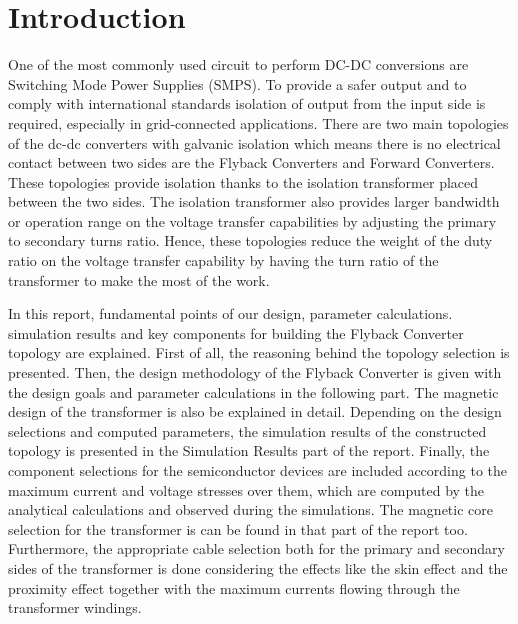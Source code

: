 \section{Introduction}

One of the most commonly used circuit to perform DC-DC conversions are Switching Mode Power Supplies (SMPS). To provide a safer output and to comply with international standards isolation of output from the input side is required, especially in grid-connected applications. There are two main topologies of the dc-dc converters with galvanic isolation which means there is no electrical contact between two sides are the Flyback Converters and Forward Converters. These topologies provide isolation thanks to the isolation transformer placed between the two sides. The isolation transformer also provides larger bandwidth or operation range on the voltage transfer capabilities by adjusting the primary to secondary turns ratio. Hence, these topologies reduce the weight of the duty ratio on the voltage transfer capability by having the turn ratio of the transformer to make the most of the work. 

In this report, fundamental points of our design, parameter calculations. simulation results and key components for building the Flyback Converter topology are explained. First of all, the reasoning behind the topology selection is presented. Then, the design methodology of the Flyback Converter is given with the design goals and parameter calculations in the following part. The magnetic design of the transformer is also be explained in detail. Depending on the design selections and computed parameters, the simulation results of the constructed topology is presented in the Simulation Results part of the report. Finally, the component selections for the semiconductor devices are included according to the maximum current and voltage stresses over them, which are computed by the analytical calculations and observed during the simulations. The magnetic core selection for the transformer is can be found in that part of the report too. Furthermore, the appropriate cable selection both for the primary and secondary sides of the transformer is done considering the effects like the skin effect and the proximity effect together with the maximum currents flowing through the transformer windings.
